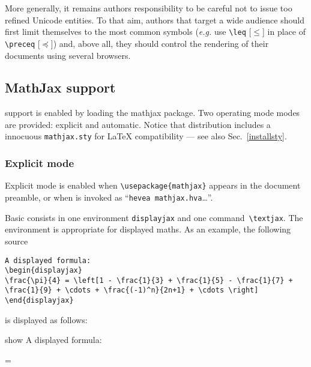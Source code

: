 More generally, it remains authors responsibility to be careful not to
issue too refined Unicode entities.  To that aim, authors that target
a wide audience should first limit themselves to the most common
symbols (\emph{e.g.} use \verb+\leq+ [$\leq$]
in place of \verb+\preceq+ [$\preceq$]) and, above all,
they should control the rendering of their documents using several browsers.

\subsection{\textsf{MathJax} \label{mathjax}support}
%
%

support is enabled by loading the
\textsf{mathjax} package. Two operating mode modes are provided:
explicit and automatic. Notice that \hevea{} distribution includes a innocuous
\texttt{mathjax.sty} for \LaTeX{} compatibility --- see also Sec.~\ref{installsty}.

\subsubsection{Explicit mode}
%
%
%
%
Explicit mode is enabled when \verb+\usepackage{mathjax}+
appears in the document preamble,
or when \hevea{} is invoked as ``\verb+hevea mathjax.hva+\ldots''.

Basic consists in one environment \texttt{displayjax}
and one command~\verb+\textjax+.
The environment is appropriate for displayed maths.
As an example, the following source
\begin{verbatim}
A displayed formula:
\begin{displayjax}
\frac{\pi}{4} = \left[1 - \frac{1}{3} + \frac{1}{5} - \frac{1}{7} +
\frac{1}{9} + \cdots + \frac{(-1)^n}{2n+1} + \cdots \right]
\end{displayjax}
\end{verbatim}
is displayed as follows:
\begin{divstyle}{show}
A displayed formula:
\begin{displayjax}
 = 
\end{displayjax}
\end{divstyle}

